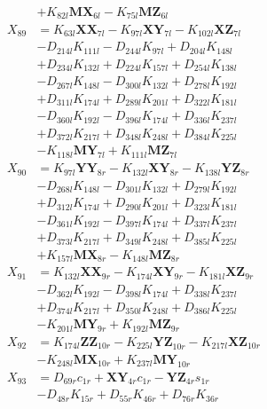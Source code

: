\begin{multicols}{2}
\begin{align}
&+ K_{82l}\mathbf{MX}_{6l} - K_{75l}\mathbf{MZ}_{6l} \nonumber \\
X_{89} &= K_{63l}\mathbf{XX}_{7l} - K_{97l}\mathbf{XY}_{7l} - K_{102l}\mathbf{XZ}_{7l}  \nonumber \\
&- D_{214l}K_{111l} - D_{244l}K_{97l} + D_{204l}K_{148l}  \nonumber \\
&+ D_{234l}K_{132l} + D_{224l}K_{157l} + D_{254l}K_{138l}  \nonumber \\
&- D_{267l}K_{148l} - D_{300l}K_{132l} + D_{278l}K_{192l}  \nonumber \\
&+ D_{311l}K_{174l} + D_{289l}K_{201l} + D_{322l}K_{181l}  \nonumber \\
&- D_{360l}K_{192l} - D_{396l}K_{174l} + D_{336l}K_{237l}  \nonumber \\
&+ D_{372l}K_{217l} + D_{348l}K_{248l} + D_{384l}K_{225l}  \nonumber \\
&- K_{118l}\mathbf{MY}_{7l} + K_{111l}\mathbf{MZ}_{7l} \nonumber \\
X_{90} &= K_{97l}\mathbf{YY}_{8r} - K_{132l}\mathbf{XY}_{8r} - K_{138l}\mathbf{YZ}_{8r}  \nonumber \\
&- D_{268l}K_{148l} - D_{301l}K_{132l} + D_{279l}K_{192l}  \nonumber \\
&+ D_{312l}K_{174l} + D_{290l}K_{201l} + D_{323l}K_{181l}  \nonumber \\
&- D_{361l}K_{192l} - D_{397l}K_{174l} + D_{337l}K_{237l}  \nonumber \\
&+ D_{373l}K_{217l} + D_{349l}K_{248l} + D_{385l}K_{225l}  \nonumber \\
&+ K_{157l}\mathbf{MX}_{8r} - K_{148l}\mathbf{MZ}_{8r} \nonumber \\
X_{91} &= K_{132l}\mathbf{XX}_{9r} - K_{174l}\mathbf{XY}_{9r} - K_{181l}\mathbf{XZ}_{9r}  \nonumber \\
&- D_{362l}K_{192l} - D_{398l}K_{174l} + D_{338l}K_{237l}  \nonumber \\
&+ D_{374l}K_{217l} + D_{350l}K_{248l} + D_{386l}K_{225l}  \nonumber \\
&- K_{201l}\mathbf{MY}_{9r} + K_{192l}\mathbf{MZ}_{9r} \nonumber \\
X_{92} &= K_{174l}\mathbf{ZZ}_{10r} - K_{225l}\mathbf{YZ}_{10r} - K_{217l}\mathbf{XZ}_{10r}  \nonumber \\
&- K_{248l}\mathbf{MX}_{10r} + K_{237l}\mathbf{MY}_{10r} \nonumber \\
X_{93} &= D_{69r}c_{1r} + \mathbf{XY}_{4r}c_{1r} - \mathbf{YZ}_{4r}s_{1r}  \nonumber \\
&- D_{48r}K_{15r} + D_{55r}K_{46r} + D_{76r}K_{36r}  \nonumber \\

\end{align}
\end{multicols}
